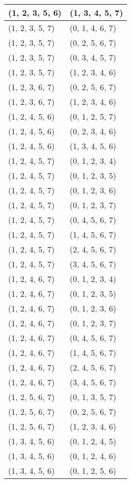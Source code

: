 \begin{footnotesize}
\begin{longtable}[c]{|l|l|}
(1, 2, 3, 5, 6)
&(1, 3, 4, 5, 7)
\\ \hline
(1, 2, 3, 5, 7)
&(0, 1, 4, 6, 7)
\\ \hline
(1, 2, 3, 5, 7)
&(0, 2, 5, 6, 7)
\\ \hline
(1, 2, 3, 5, 7)
&(0, 3, 4, 5, 7)
\\ \hline
(1, 2, 3, 5, 7)
&(1, 2, 3, 4, 6)
\\ \hline
(1, 2, 3, 6, 7)
&(0, 2, 5, 6, 7)
\\ \hline
(1, 2, 3, 6, 7)
&(1, 2, 3, 4, 6)
\\ \hline
(1, 2, 4, 5, 6)
&(0, 1, 2, 5, 7)
\\ \hline
(1, 2, 4, 5, 6)
&(0, 2, 3, 4, 6)
\\ \hline
(1, 2, 4, 5, 6)
&(1, 3, 4, 5, 6)
\\ \hline
(1, 2, 4, 5, 7)
&(0, 1, 2, 3, 4)
\\ \hline
(1, 2, 4, 5, 7)
&(0, 1, 2, 3, 5)
\\ \hline
(1, 2, 4, 5, 7)
&(0, 1, 2, 3, 6)
\\ \hline
(1, 2, 4, 5, 7)
&(0, 1, 2, 3, 7)
\\ \hline
(1, 2, 4, 5, 7)
&(0, 4, 5, 6, 7)
\\ \hline
(1, 2, 4, 5, 7)
&(1, 4, 5, 6, 7)
\\ \hline
(1, 2, 4, 5, 7)
&(2, 4, 5, 6, 7)
\\ \hline
(1, 2, 4, 5, 7)
&(3, 4, 5, 6, 7)
\\ \hline
(1, 2, 4, 6, 7)
&(0, 1, 2, 3, 4)
\\ \hline
(1, 2, 4, 6, 7)
&(0, 1, 2, 3, 5)
\\ \hline
(1, 2, 4, 6, 7)
&(0, 1, 2, 3, 6)
\\ \hline
(1, 2, 4, 6, 7)
&(0, 1, 2, 3, 7)
\\ \hline
(1, 2, 4, 6, 7)
&(0, 4, 5, 6, 7)
\\ \hline
(1, 2, 4, 6, 7)
&(1, 4, 5, 6, 7)
\\ \hline
(1, 2, 4, 6, 7)
&(2, 4, 5, 6, 7)
\\ \hline
(1, 2, 4, 6, 7)
&(3, 4, 5, 6, 7)
\\ \hline
(1, 2, 5, 6, 7)
&(0, 1, 3, 5, 7)
\\ \hline
(1, 2, 5, 6, 7)
&(0, 2, 5, 6, 7)
\\ \hline
(1, 2, 5, 6, 7)
&(1, 2, 3, 4, 6)
\\ \hline
(1, 3, 4, 5, 6)
&(0, 1, 2, 4, 5)
\\ \hline
(1, 3, 4, 5, 6)
&(0, 1, 2, 4, 6)
\\ \hline
(1, 3, 4, 5, 6)
&(0, 1, 2, 5, 6)

\end{longtable}
\end{footnotesize}
